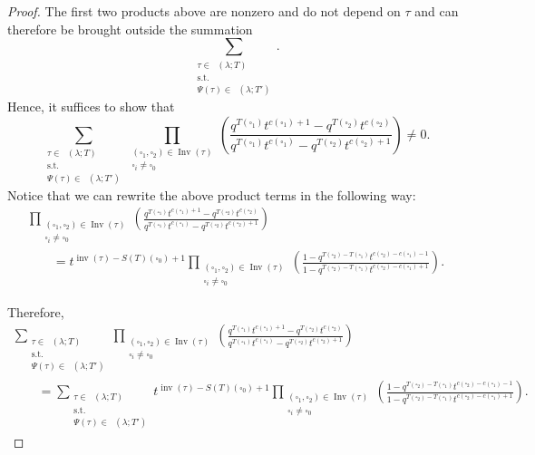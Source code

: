 \documentclass[10pt,a4paper]{amsart}
\numberwithin{equation}{section}
\theoremstyle{definition}
\DeclareMathOperator{\PSYT}{\mathrm{PSYT}_{\geq 0}}
\DeclareMathOperator{\Inv}{\mathrm{Inv}}
\DeclareMathOperator{\inv}{inv}
\begin{document}
\begin{proof}
The first two products above are nonzero and do not depend on $\tau$ and can therefore be brought outside the summation
\[
 \sum_{\substack{\tau \in \PSYT(\lambda;T) \\ \text{s.t.}\\ \Psi(\tau) \in \PSYT(\lambda;T')}}.
\]
Hence, it suffices to show that
\[
\sum_{\substack{\tau \in \PSYT(\lambda;T) \\ \text{s.t.}\\ \Psi(\tau) \in \PSYT(\lambda;T')}} \prod_{\substack{(\square_1,\square_2) \in \Inv(\tau)\\ \square_i \neq \square_0}} \left( \frac{q^{T(\square_1)}t^{c(\square_1)+1} - q^{T(\square_2)}t^{c(\square_2)}}{q^{T(\square_1)}t^{c(\square_1)} - q^{T(\square_2)}t^{c(\square_2)+1}} \right) \neq 0.
\]
Notice that we can rewrite the above product terms in the following way:
\begin{gather*}
 \prod_{\substack{(\square_1,\square_2) \in \Inv(\tau)\\ \square_i \neq \square_0}} \left( \frac{q^{T(\square_1)}t^{c(\square_1)+1} - q^{T(\square_2)}t^{c(\square_2)}}{q^{T(\square_1)}t^{c(\square_1)} - q^{T(\square_2)}t^{c(\square_2)+1}} \right) \\
 \qquad = t^{\inv(\tau) -S(T)(\square_0)+1} \prod_{\substack{(\square_1,\square_2) \in \Inv(\tau)\\ \square_i \neq \square_0}} \left( \frac{1 - q^{T(\square_2)-T(\square_1)}t^{c(\square_2)-c(\square_1)-1}}{1 - q^{T(\square_2)-T(\square_1)}t^{c(\square_2)-c(\square_1)+1}} \right) .
\end{gather*}

Therefore,
\begin{gather*}
\sum_{\substack{\tau \in \PSYT(\lambda;T) \\ \text{s.t.}\\ \Psi(\tau) \in \PSYT(\lambda;T')}} \prod_{\substack{(\square_1,\square_2) \in \Inv(\tau)\\ \square_i \neq \square_0}} \left( \frac{q^{T(\square_1)}t^{c(\square_1)+1} - q^{T(\square_2)}t^{c(\square_2)}}{q^{T(\square_1)}t^{c(\square_1)} - q^{T(\square_2)}t^{c(\square_2)+1}} \right) \\
\qquad= \sum_{\substack{\tau \in \PSYT(\lambda;T) \\ \text{s.t.}\\ \Psi(\tau) \in \PSYT(\lambda;T')}} t^{\inv(\tau) -S(T)(\square_0)+1} \prod_{\substack{(\square_1,\square_2) \in \Inv(\tau)\\ \square_i \neq \square_0}} \left( \frac{1 - q^{T(\square_2)-T(\square_1)}t^{c(\square_2)-c(\square_1)-1}}{1 - q^{T(\square_2)-T(\square_1)}t^{c(\square_2)-c(\square_1)+1}} \right) .
\end{gather*}


\end{proof}
\end{document}
